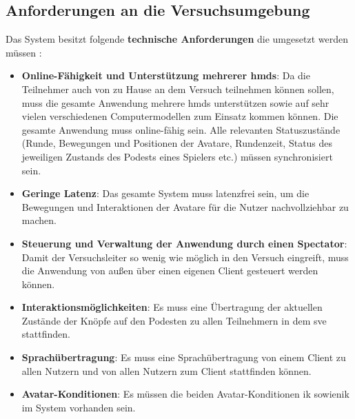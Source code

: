 \documentclass[a4paper,11pt]{article}%
\renewcommand{\\}{\vspace*{0.5\baselineskip} \newline}
\begin{document}
	\subsection{Anforderungen an die Versuchsumgebung}
\label{TechnischeAnforderungen}
Das System besitzt folgende \textbf{technische Anforderungen} die umgesetzt werden müssen :
\begin{itemize}
\item \textbf{Online-Fähigkeit und Unterstützung mehrerer \ac{hmd}s}: Da die Teilnehmer auch von zu Hause an dem Versuch teilnehmen können sollen, muss die gesamte Anwendung mehrere \ac{hmd}s unterstützen sowie auf sehr vielen verschiedenen Computermodellen zum Einsatz kommen können. Die gesamte Anwendung muss online-fähig sein. Alle relevanten Statuszustände (Runde, Bewegungen und Positionen der Avatare, Rundenzeit, Status des jeweiligen Zustands des Podests eines Spielers etc.) müssen synchronisiert sein.
\item \textbf{Geringe Latenz}: Das gesamte System muss latenzfrei sein, um die Bewegungen und Interaktionen der Avatare für die Nutzer nachvollziehbar zu machen.
\item \textbf{Steuerung und Verwaltung der Anwendung durch einen Spectator}: Damit der Versuchsleiter so wenig wie möglich in den Versuch eingreift, muss die Anwendung von außen über einen eigenen Client gesteuert werden können.
\item \textbf{Interaktionsmöglichkeiten}: Es muss eine Übertragung der aktuellen Zustände der Knöpfe auf den Podesten zu allen Teilnehmern in dem \ac{sve} stattfinden.
\item \textbf{Sprachübertragung}: Es muss eine Sprachübertragung von einem Client zu allen Nutzern und von allen Nutzern zum Client stattfinden können.
\item \textbf{Avatar-Konditionen}: Es müssen die beiden Avatar-Konditionen \ac{ik} sowie\newline \ac{nik} im System vorhanden sein.
\end{itemize}
\end{document}
